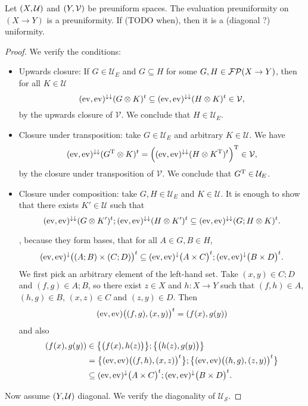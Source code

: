 \begin{lemma}
Let $\left( X, \mathcal{U} \right)$ and $\left( Y,\mathcal{V} \right)$ be preuniform spaces. The evaluation preuniformity on $(X\to Y)$ is a preuniformity. If (TODO when), then it is a (diagonal ?) uniformity.
\end{lemma}
\begin{proof}
We verify the conditions:
\begin{itemize}
\item Upwards closure: If $G\in \mathcal{U}_E$ and $G\subseteq H$ for some $G,H\in\operatorname{\mathcal{FP}}(X\to Y)$, then for all $K\in \mathcal{U}$
\[ (\operatorname{ev}, \operatorname{ev})^{\downarrow\downarrow}(G\otimes K)^t \subseteq (\operatorname{ev}, \operatorname{ev})^{\downarrow\downarrow}(H\otimes K)^t \in \mathcal{V}, \]
by the upwards closure of $\mathcal{V}$. We conclude that $H\in \mathcal{U}_E$.
\item Closure under transposition: take $G\in \mathcal{U}_E$ and arbitrary $K\in \mathcal{U}$. We have
\[ (\operatorname{ev}, \operatorname{ev})^{\downarrow\downarrow}(G^{\mathrm{T}}\otimes K)^t = \Big((\operatorname{ev}, \operatorname{ev})^{\downarrow\downarrow}(H\otimes K^{\mathrm{T}})^t\Big)^{\mathrm{T}} \in \mathcal{V}, \]
by the closure under transposition of $\mathcal{V}$. We conclude that $G^{\mathrm{T}}\in \mathcal{U}_E$.
\item Closure under composition: take $G,H\in\mathcal{U}_E$ and $K\in\mathcal{U}$. It is enough to show that there exists $K'\in\mathcal{U}$ such that
\[ (\operatorname{ev}, \operatorname{ev})^{\downarrow\downarrow}(G\otimes K')^t;(\operatorname{ev}, \operatorname{ev})^{\downarrow\downarrow}(H\otimes K')^t \subseteq (\operatorname{ev}, \operatorname{ev})^{\downarrow\downarrow}(G;H\otimes K)^t. \]


, because they form bases, that for all $A\in G, B\in H$,
\[ (\operatorname{ev}, \operatorname{ev})^\downarrow\big((A;B) \times (C;D)\big)^t \subseteq (\operatorname{ev}, \operatorname{ev})^\downarrow\big(A \times C\big)^t ; (\operatorname{ev}, \operatorname{ev})^\downarrow\big(B \times D\big)^t. \]
We first pick an arbitrary element of the left-hand set. Take $(x,y)\in C;D$ and $(f, g)\in A;B$, so there exist $z\in X$ and $h:X\to Y$ such that $(f,h)\in A$, $(h,g)\in B$, $(x,z)\in C$ and $(z,y)\in D$. Then
\[ (\operatorname{ev}, \operatorname{ev})\big((f,g), (x,y)\big)^t = (f(x), g(y)) \]
and also
\begin{align*}
(f(x), g(y)) &\in \big\{\big(f(x), h(z)\big)\big\};\big\{\big(h(z), g(y)\big)\big\} \\
&= \big\{(\operatorname{ev}, \operatorname{ev})\big((f,h), (x,z)\big)^t\big\};\big\{(\operatorname{ev}, \operatorname{ev})\big((h,g), (z,y)\big)^t\big\} \\
&\subseteq (\operatorname{ev}, \operatorname{ev})^\downarrow\big(A \times C\big)^t ; (\operatorname{ev}, \operatorname{ev})^\downarrow\big(B \times D\big)^t.
\end{align*}
\end{itemize}
Now assume $\left( Y, \mathcal{U} \right)$ diagonal. We verify the diagonality of $\mathcal{U}_\mathcal{S}$.


\end{proof}
